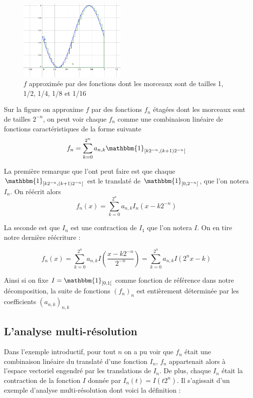 \documentclass[]{article}
\theoremstyle{remark}
\theoremstyle{definition}
\begin{document}
\begin{figure}[h]
		\includegraphics[width=150pt]{sin_16.png}
		\caption{$f$ approximée par des fonctions dont les morceaux sont de tailles 1, 1/2, 1/4, 1/8 et 1/16}
	\end{figure}
	
	\newpage
	
	Sur la figure on approxime $f$ par des fonctions $f_n$ étagées dont les morceaux sont de tailles $2^{-n}$, on peut voir chaque $f_n$ comme une combinaison linéaire de fonctions caractéristiques de la forme suivante $$f_n = \sum_{k = 0}^{2^n} a_{n, k} \mathbbm{1}_{[k 2^{-n}, (k+1)2^{-n}[}$$
	
	La première remarque que l'ont peut faire est que chaque $\mathbbm{1}_{[k 2^{-n}, (k+1)2^{-n}[}$ est le translaté de $\mathbbm{1}_{[0, 2^{-n}[}$, que l'on notera $I_n$. On réécrit alors $$f_n(x) = \sum_{k = 0}^{2^n} a_{n, k} I_n\left(x - k 2^{-n}\right)$$
	
	La seconde est que $I_n$ est une contraction de $I_1$ que l'on notera $I$. On en tire notre dernière réécriture :
	
	$$f_n(x) = \sum_{k = 0}^{2^n} a_{n, k} I \left(\frac{x - k 2^{-n}}{2^{-n}}\right) = \sum_{k = 0}^{2^n} a_{n, k} I \left(2^n x - k\right)$$
	
	Ainsi si on fixe $I = \mathbbm{1}_{[0, 1[}$ comme fonction de référence dans notre décomposition, la suite de fonctions $(f_n)_n$ est entièrement déterminée par les coefficients $(a_{n, k})_{n, k}$
	
	\subsection{L'analyse multi-résolution}
	
	Dans l'exemple introductif, pour tout $n$ on a pu voir que $f_n$ était une combinaison linéaire du translaté d'une fonction $I_n$, $f_n$ appartenait alors à l'espace vectoriel engendré par les translations de $I_n$. De plus, chaque $I_n$ était la contraction de la fonction $I$ donnée par $I_n(t) = I\left(t 2^n\right)$. Il s'agissait d'un exemple d'analyse multi-résolution dont voici la définition :
	
\end{document}
